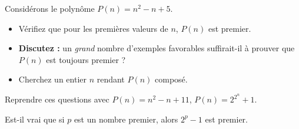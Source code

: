 Considérons le polynôme $P(n) = n^2 - n + 5$.
\begin{itemize}
  \item Vérifiez que pour les premières valeurs de $n$, $P(n)$ est premier.
  \item \textbf{Discutez :} un \emph{grand} nombre d'exemples favorables
  suffirait-il à prouver que $P(n)$ est toujours premier ?
  \item Cherchez un entier $n$ rendant $P(n)$ composé.
\end{itemize}
Reprendre ces questions avec $P(n) = n^2 - n + 11$, $P(n) = 2^{2^n} + 1$.

Est-il vrai que si $p$ est un nombre premier, alors $2^p - 1$ est premier.
